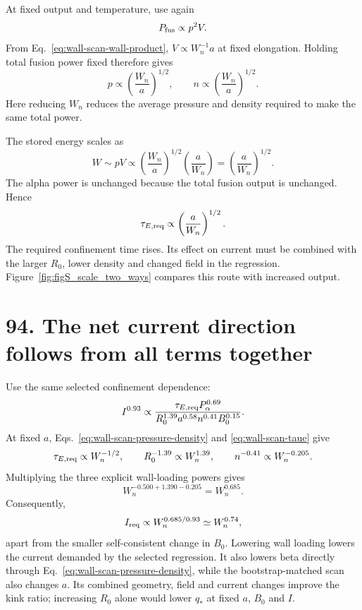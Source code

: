 \documentclass[11pt]{article}
\begin{document}
At fixed output and temperature, use again
\[
 P_{\rm fus}\propto p^2V.
\]
From Eq.~\eqref{eq:wall-scan-wall-product}, $V\propto W_n^{-1}a$ at fixed
elongation. Holding total fusion power fixed therefore gives
\begin{equation}
 p\propto\left(\frac{W_n}{a}\right)^{1/2},\qquad
 n\propto\left(\frac{W_n}{a}\right)^{1/2}.
 \label{eq:wall-scan-pressure-density}
\end{equation}
Here reducing $W_n$ reduces the average pressure and density required to make the same total power.

The stored energy scales as
\[
 W\sim pV\propto
\left(\frac{W_n}{a}\right)^{1/2}\left(\frac a{W_n}\right)
=\left(\frac a{W_n}\right)^{1/2}.
\]
The alpha power is unchanged because the total fusion output is unchanged. Hence
\begin{equation}
 \tau_{E,\rm req}\propto\left(\frac a{W_n}\right)^{1/2}.
 \label{eq:wall-scan-taue}
\end{equation}
The required confinement time rises. Its effect on current must be combined with
the larger $R_0$, lower density and changed field in the regression.
Figure~\ref{fig:figS_scale_two_ways} compares this route with increased output.

\section*{94. The net current direction follows from all terms together}

Use the same selected confinement dependence:
\[
 I^{0.93}\propto
\frac{\tau_{E,\rm req}P_\alpha^{0.69}}
{R_0^{1.39}a^{0.58}n^{0.41}B_0^{0.15}}.
\]
At fixed $a$, Eqs.~\eqref{eq:wall-scan-pressure-density} and
\eqref{eq:wall-scan-taue} give
\[
 \tau_{E,\rm req}\propto W_n^{-1/2},\qquad
 R_0^{-1.39}\propto W_n^{1.39},\qquad
 n^{-0.41}\propto W_n^{-0.205}.
\]
Multiplying the three explicit wall-loading powers gives
\[
 W_n^{-0.500+1.390-0.205}=W_n^{0.685}.
\]
Consequently,
\begin{equation}
 I_{\rm req}\propto W_n^{0.685/0.93}
\simeq W_n^{0.74},
 \label{eq:wall-scan-current-direction}
\end{equation}
apart from the smaller self-consistent change in $B_0$. Lowering wall loading lowers
the current demanded by the selected regression. It also lowers beta directly through
Eq.~\eqref{eq:wall-scan-pressure-density}, while the bootstrap-matched scan also changes $a$. Its combined geometry, field and
current changes improve the kink ratio; increasing $R_0$ alone would lower $q_*$ at
fixed $a$, $B_0$ and $I$.
\end{document}
